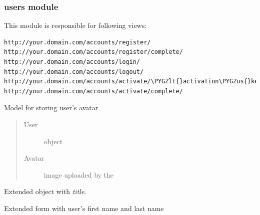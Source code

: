 \documentclass[letterpaper,10pt,english]{sphinxmanual}
\def\PYGZus{\char`\_}
\def\PYGZlt{\char`\<}
\def\PYGZgt{\char`\>}
\begin{document}
\subsubsection{users module}
\label{web_portal:users-module}
This module is responsible for following views:

\begin{Verbatim}[commandchars=\\\{\}]
http://your.domain.com/accounts/register/
http://your.domain.com/accounts/register/complete/
http://your.domain.com/accounts/login/
http://your.domain.com/accounts/logout/
http://your.domain.com/accounts/activate/\PYGZlt{}activation\PYGZus{}key\PYGZgt{}/
http://your.domain.com/accounts/activate/complete/
\end{Verbatim}

\begin{fulllineitems}
\label{web_portal:core.users.models.UserProfile}
Model for storing user's avatar
\begin{quote}\begin{description}
\item[{User}] \leavevmode
{} object

\item[{Avatar}] \leavevmode
image uploaded by the 

\end{description}\end{quote}

\end{fulllineitems}


\begin{fulllineitems}
\label{web_portal:core.users.views.CustomRegistrationView}
Extended  object with
\emph{title}.

\end{fulllineitems}


\begin{fulllineitems}
\label{web_portal:core.users.forms.AppUserForm}
Extended  form
with user's first name and last name

\end{fulllineitems}
\end{document}
